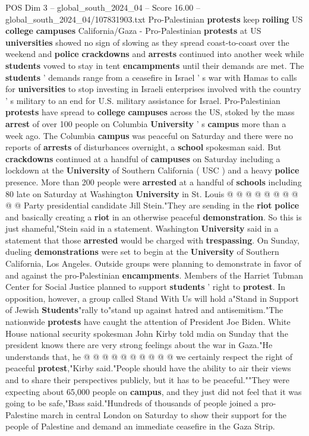 \begin{textsample}{POS Dim 3 – global\_south\_2024\_04 – Score 16.00 – global\_south\_2024\_04/107831903.txt}  \label{ex:f3_pos_197}
Pro-Palestinian \textbf{protests} keep \textbf{roiling} US \textbf{college} \textbf{campuses} California/Gaza - Pro-Palestinian \textbf{protests} at US \textbf{universities} showed no sign of slowing as they spread coast-to-coast over the weekend and \textbf{police} \textbf{crackdowns} and \textbf{arrests} continued into another week while \textbf{students} vowed to stay in tent \textbf{encampments} until their demands are met.
The \textbf{students} ' demands range from a ceasefire in Israel ' s war with Hamas to calls for \textbf{universities} to stop investing in Israeli enterprises involved with the country ' s military to an end for U.S. military assistance for Israel.
Pro-Palestinian \textbf{protests} have spread to \textbf{college} \textbf{campuses} across the US, stoked by the mass \textbf{arrest} of over 100 people on Columbia \textbf{University} ' s \textbf{campus} more than a week ago.
The Columbia \textbf{campus} was peaceful on Saturday and there were no reports of \textbf{arrests} of disturbances overnight, a \textbf{school} spokesman said.
But \textbf{crackdowns} continued at a handful of \textbf{campuses} on Saturday including a lockdown at the \textbf{University} of Southern California ( USC ) and a heavy \textbf{police} presence.
More than 200 people were \textbf{arrested} at a handful of \textbf{schools} including 80 late on Saturday at Washington \textbf{University} in St.
Louis @ @ @ @ @ @ @ @ @ @ Party presidential candidate Jill Stein."They are sending in the \textbf{riot} \textbf{police} and basically creating a \textbf{riot} in an otherwise peaceful \textbf{demonstration}.
So this is just shameful,"Stein said in a statement.
Washington \textbf{University} said in a statement that those \textbf{arrested} would be charged with \textbf{trespassing}.
On Sunday, dueling \textbf{demonstrations} were set to begin at the \textbf{University} of Southern California, Los Angeles.
Outside groups were planning to demonstrate in favor of and against the pro-Palestinian \textbf{encampments}.
Members of the Harriet Tubman Center for Social Justice planned to support \textbf{students} ' right to \textbf{protest}.
In opposition, however, a group called Stand With Us will hold a"Stand in Support of Jewish \textbf{Students}"rally to"stand up against hatred and antisemitism."The nationwide \textbf{protests} have caught the attention of President Joe Biden.
White House national security spokesman John Kirby told mdia on Sunday that the president knows there are very strong feelings about the war in Gaza."He understands that, he @ @ @ @ @ @ @ @ @ @ we certainly respect the right of peaceful \textbf{protest},"Kirby said."People should have the ability to air their views and to share their perspectives publicly, but it has to be peaceful.""They were expecting about 65,000 people on \textbf{campus}, and they just did not feel that it was going to be safe,"Bass said."Hundreds of thousands of people joined a pro-Palestine march in central London on Saturday to show their support for the people of Palestine and demand an immediate ceasefire in the Gaza Strip.

\end{textsample}
